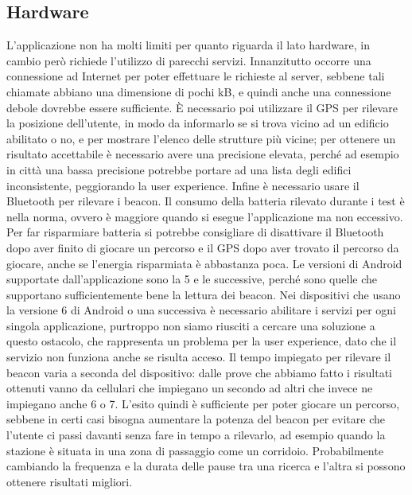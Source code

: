 	\subsection{Hardware}
		L'applicazione non ha molti limiti per quanto riguarda il lato hardware, in cambio però richiede l'utilizzo di parecchi servizi. Innanzitutto occorre una connessione ad Internet per poter effettuare le richieste al server, sebbene tali chiamate abbiano una dimensione di pochi kB, e quindi anche una connessione debole dovrebbe essere sufficiente. È necessario poi utilizzare il GPS per rilevare la posizione dell'utente, in modo da informarlo se si trova vicino ad un edificio abilitato o no, e per mostrare l'elenco delle strutture più vicine; per ottenere un risultato accettabile è necessario avere una precisione elevata, perché ad esempio in città una bassa precisione potrebbe portare ad una lista degli edifici inconsistente, peggiorando la user experience. Infine è necessario usare il Bluetooth per rilevare i beacon.
		Il consumo della batteria rilevato durante i test è nella norma, ovvero è maggiore quando si esegue l'applicazione ma non eccessivo. Per far risparmiare batteria si potrebbe consigliare di disattivare il Bluetooth dopo aver finito di giocare un percorso e il GPS dopo aver trovato il percorso da giocare, anche se l'energia risparmiata è abbastanza poca.
		Le versioni di Android supportate dall'applicazione sono la 5 e le successive, perché sono quelle che supportano sufficientemente bene la lettura dei beacon. Nei dispositivi che usano la versione 6 di Android o una successiva è necessario abilitare i servizi per ogni singola applicazione, purtroppo non siamo riusciti a cercare una soluzione a questo ostacolo, che rappresenta un problema per la user experience, dato che il servizio non funziona anche se risulta acceso.
		Il tempo impiegato per rilevare il beacon varia a seconda del dispositivo: dalle prove che abbiamo fatto i risultati ottenuti vanno da cellulari che impiegano un secondo ad altri che invece ne impiegano anche 6 o 7. L'esito quindi è sufficiente per poter giocare un percorso, sebbene in certi casi bisogna aumentare la potenza del beacon per evitare che l'utente ci passi davanti senza fare in tempo a rilevarlo, ad esempio quando la stazione è situata in una zona di passaggio come un corridoio. Probabilmente cambiando la frequenza e la durata delle pause tra una ricerca e l'altra si possono ottenere risultati migliori.
